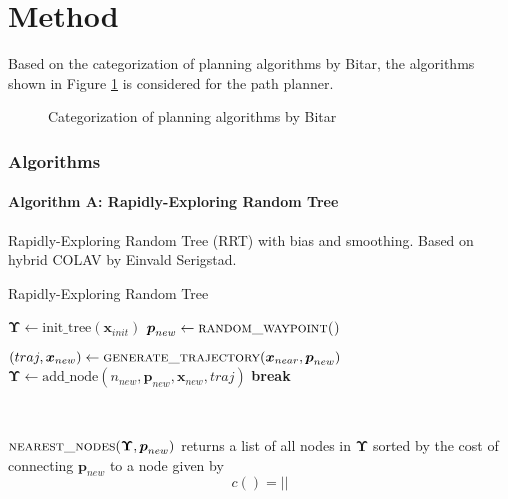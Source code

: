 
\part{Method}

Based on the categorization of planning algorithms by Bitar\cite{bitar}, the algorithms shown in Figure \ref{fig:algorithms} is considered for the path planner.

\begin{figure}[h]
    \centering
    
    \caption{Categorization of planning algorithms by Bitar\cite{bitar}}
    \label{fig:algorithms}
\end{figure}

\section{Algorithms}
\subsection{Algorithm A: Rapidly-Exploring Random Tree}

Rapidly-Exploring Random Tree (RRT) with bias and smoothing. Based on hybrid COLAV by Einvald Serigstad.

\begin{algorithm}
\caption{Rapidly-Exploring Random Tree}\label{euclid}
\begin{algorithmic}[1]
\State $\boldsymbol{\Upsilon} \gets \text{init\_tree}(\boldsymbol{x}_{init})$
\Repeat
\State $\boldsymbol{p}_{new} \gets \textsc{random\_waypoint()}$


\State $(traj,\boldsymbol{x}_{new}) \gets \textsc{generate\_trajectory}(\boldsymbol{x}_{near}, \boldsymbol{p}_{new})$
	\State $\boldsymbol{\Upsilon} \gets \text{add\_node}(n_{new}, \boldsymbol{p}_{new}, \boldsymbol{x}_{new}, traj)$
	\State \textbf{break}
\EndIf
\EndFor

\
\State \Return{$\boldsymbol{\Upsilon}$}
\EndProcedure

\end{algorithmic}
\end{algorithm}


$\textsc{nearest\_nodes}(\boldsymbol{\Upsilon}, \boldsymbol{p}_{new})$ returns a list of all nodes in $\boldsymbol{\Upsilon}$ sorted by the cost of connecting $\boldsymbol{p}_{new}$ to a node given by
\begin{equation}
	c() =  ||
\end{equation}

